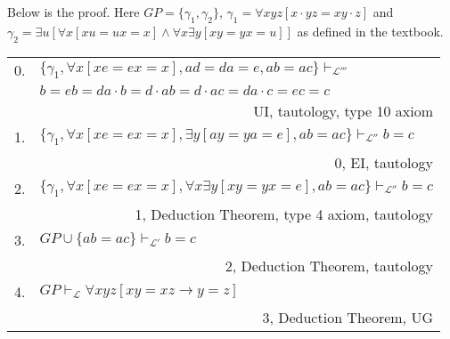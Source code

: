 \documentclass[12pt]{article}
\theoremstyle{definition}
\newenvironment{customthm}[1]
  {\renewcommand\theinnercustomthm{#1}\innercustomthm}
  {\endinnercustomthm}
\begin{document}
\begin{customthm}{II.11.11} Below is the proof. Here $GP=\{\gamma_1,\gamma_2\}$, $\gamma_1=\forall xyz[x\cdot yz=xy\cdot z]$ and $\gamma_2=\exists u[\forall x[xu=ux=x]\wedge\forall x\exists y[xy=yx=u]]$ as defined in the textbook.
\begin{center}
\begin{tabular}{llr}
  0. & \multicolumn{2}{l}{$\{\gamma_1,\forall x[xe=ex=x],ad=da=e,ab=ac\}\vdash_{\mathcal{L}'''}$} \\
  & \multicolumn{2}{l}{$b=eb=da\cdot b=d\cdot ab=d\cdot ac=da\cdot c=ec=c$} \\
  && UI, tautology, type 10 axiom \\
  1. & \multicolumn{2}{l}{$\{\gamma_1,\forall x[xe=ex=x],\exists y[ay=ya=e],ab=ac\}\vdash_{\mathcal{L}''}b=c$} \\
  && 0, EI, tautology \\
  2. & \multicolumn{2}{l}{$\{\gamma_1,\forall x[xe=ex=x],\forall x\exists y[xy=yx=e],ab=ac\}\vdash_{\mathcal{L}''}b=c$} \\
  && 1, Deduction Theorem, type 4 axiom, tautology \\
  3. & \multicolumn{2}{l}{$GP\cup\{ab=ac\}\vdash_{\mathcal{L}'}b=c$} \\
  && 2, Deduction Theorem, tautology \\
  4. & \multicolumn{2}{l}{$GP\vdash_\mathcal{L}\forall xyz[xy=xz\rightarrow y=z]$} \\
  && 3, Deduction Theorem, UG
\end{tabular}
\end{center}
\end{customthm}
\end{document}
